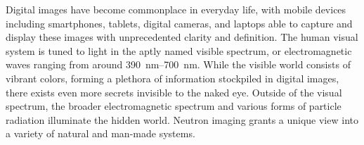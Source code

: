 \documentclass[../../main.tex]{subfiles}%
\begin{document}
%
    \Xsection%
    Digital images have become commonplace in everyday life, with mobile devices including smartphones, tablets, digital cameras, and laptops able to capture and display these images with unprecedented clarity and definition. 
    The human visual system is tuned to light in the aptly named visible spectrum, or electromagnetic waves ranging from around \SIrange{390}{700}{\nano\meter}.
    While the visible world consists of vibrant colors, forming a plethora of information stockpiled in digital images, there exists even more secrets invisible to the naked eye. 
    Outside of the visual spectrum, the broader electromagnetic spectrum and various forms of particle \gls{radiation} illuminate the hidden world.
    Neutron imaging grants a unique view into a variety of natural and man-made systems.
\end{document}
